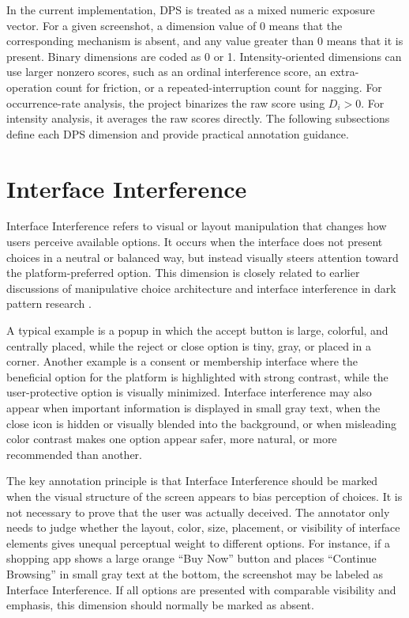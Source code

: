 In the current implementation, DPS is treated as a mixed numeric exposure vector. For a given screenshot, a dimension value of 0 means that the corresponding mechanism is absent, and any value greater than 0 means that it is present. Binary dimensions are coded as 0 or 1. Intensity-oriented dimensions can use larger nonzero scores, such as an ordinal interference score, an extra-operation count for friction, or a repeated-interruption count for nagging. For occurrence-rate analysis, the project binarizes the raw score using \(D_i>0\). For intensity analysis, it averages the raw scores directly. The following subsections define each DPS dimension and provide practical annotation guidance.

\section{Interface Interference}

Interface Interference refers to visual or layout manipulation that changes how users perceive available options. It occurs when the interface does not present choices in a neutral or balanced way, but instead visually steers attention toward the platform-preferred option. This dimension is closely related to earlier discussions of manipulative choice architecture and interface interference in dark pattern research \cite{gray2018darkpatterns,mathur2021whatmakesdark}.

A typical example is a popup in which the accept button is large, colorful, and centrally placed, while the reject or close option is tiny, gray, or placed in a corner. Another example is a consent or membership interface where the beneficial option for the platform is highlighted with strong contrast, while the user-protective option is visually minimized. Interface interference may also appear when important information is displayed in small gray text, when the close icon is hidden or visually blended into the background, or when misleading color contrast makes one option appear safer, more natural, or more recommended than another.

The key annotation principle is that Interface Interference should be marked when the visual structure of the screen appears to bias perception of choices. It is not necessary to prove that the user was actually deceived. The annotator only needs to judge whether the layout, color, size, placement, or visibility of interface elements gives unequal perceptual weight to different options. For instance, if a shopping app shows a large orange ``Buy Now'' button and places ``Continue Browsing'' in small gray text at the bottom, the screenshot may be labeled as Interface Interference. If all options are presented with comparable visibility and emphasis, this dimension should normally be marked as absent.

